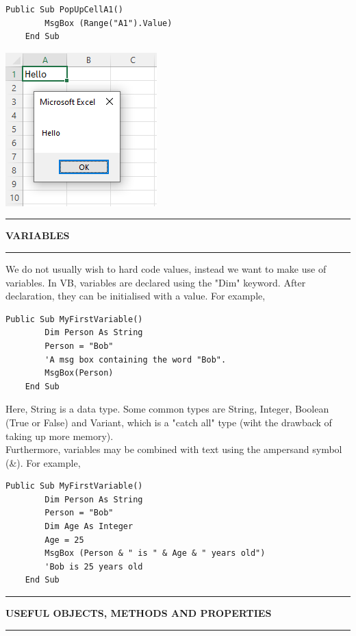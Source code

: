 \documentclass[8pt]{extarticle}
\newcommand{\heading}[1]{%
    \noindent
    \rule{\linewidth}{0.4pt}
    \begin{center}
        \vspace{-1ex}
        \textbf{#1}        
        \vspace{-2.5ex}
    \end{center}
    \rule{\linewidth}{0.4pt}
}
\begin{document}
\begin{multicols}{3}
\begin{lstlisting}[style=vba]
    Public Sub PopUpCellA1()
        MsgBox (Range("A1").Value)
    End Sub
\end{lstlisting}
\begin{center}
    \includegraphics[width = 0.6\columnwidth]{images/MsgBoxSub.png}
\end{center}

\columnbreak
\heading{VARIABLES}

We do not usually wish to hard code values, instead we want to make use of variables. In VB, variables are declared using the "Dim" keyword. After declaration, they can be initialised with a value. For example,

\begin{lstlisting}[style=vba]
    Public Sub MyFirstVariable()
        Dim Person As String
        Person = "Bob"
        'A msg box containing the word "Bob".
        MsgBox(Person)
    End Sub
\end{lstlisting}
Here, String is a data type. Some common types are String, Integer, Boolean (True or False) and Variant, which is a "catch all" type (wiht the drawback of taking up more memory). \\

Furthermore, variables may be combined with text using the ampersand symbol (\&). For example, 
\begin{lstlisting}[style=vba]
    Public Sub MyFirstVariable()
        Dim Person As String
        Person = "Bob"
        Dim Age As Integer
        Age = 25
        MsgBox (Person & " is " & Age & " years old")
        'Bob is 25 years old
    End Sub
\end{lstlisting}

\heading{USEFUL OBJECTS, METHODS AND PROPERTIES}


\end{multicols}
\end{document}
